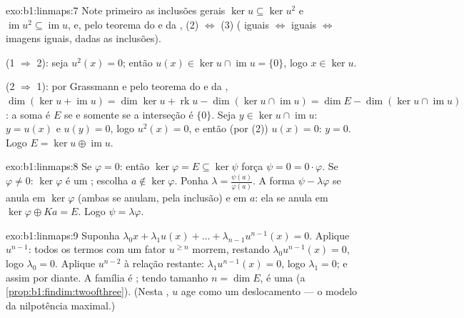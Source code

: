 \begin{solution}{exo:b1:linmaps:7}
Note primeiro as inclusões gerais $\ker u \subseteq \ker u^2$ e $\operatorname{im} u^2 \subseteq \operatorname{im} u$, e, pelo teorema do
 e da , (2) $\iff$ (3) ( iguais $\iff$ 
iguais $\iff$ imagens iguais, dadas as inclusões).

(1 $\Rightarrow$ 2): seja $u^2(x) = 0$; então $u(x) \in \ker u \cap
\operatorname{im} u = \{0\}$, logo $x \in \ker u$.

(2 $\Rightarrow$ 1): por Grassmann e pelo teorema do  e da ,
$\dim(\ker u +
\operatorname{im} u) = \dim\ker u + \operatorname{rk} u -
\dim(\ker u \cap \operatorname{im} u) = \dim E - \dim(\ker u \cap
\operatorname{im} u)$: a soma é $E$ se e somente se a interseção é $\{0\}$. Seja
$y \in \ker u \cap \operatorname{im} u$: $y = u(x)$ e $u(y) = 0$, logo $u^2(x) = 0$, e então (por (2)) $u(x) = 0$: $y = 0$.
Logo $E = \ker u \oplus \operatorname{im} u$.
\end{solution}

\begin{solution}{exo:b1:linmaps:8}
Se $\varphi = 0$: então $\ker\varphi = E \subseteq \ker\psi$ força $\psi = 0 = 0\cdot\varphi$. Se $\varphi \neq 0$: $\ker\varphi$ é um ;
escolha $a \notin \ker\varphi$. Ponha $\lambda =
\frac{\psi(a)}{\varphi(a)}$. A forma $\psi - \lambda\varphi$ se anula em $\ker\varphi$ (ambas
se anulam, pela inclusão) e em $a$: ela se anula em $\ker\varphi \oplus Ka = E$. Logo
$\psi =
\lambda\varphi$.
\end{solution}

\begin{solution}{exo:b1:linmaps:9}
Suponha $\lambda_0 x + \lambda_1 u(x) + \dots + \lambda_{n-1}
u^{n-1}(x) = 0$. Aplique $u^{n-1}$: todos os termos com um fator
$u^{\geq
n}$ morrem, restando $\lambda_0 u^{n-1}(x) = 0$, logo $\lambda_0 = 0$. Aplique $u^{n-2}$ à
relação restante: $\lambda_1 u^{n-1}(x) =
0$, logo $\lambda_1 = 0$; e assim por diante. A família é
; tendo tamanho $n = \dim E$, é uma  (a \cref{prop:b1:findim:twoofthree}). (Nesta , $u$
age como um deslocamento --- o modelo da nilpotência maximal.)
\end{solution}

